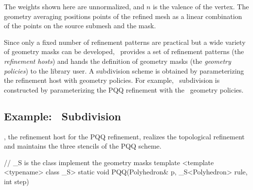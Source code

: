 
The weights shown here are unnormalized, and $n$ is the valence 
of the vertex. 
The geometry averaging positions points of the refined mesh 
as a linear combination of the points on the source submesh and 
the mask.

Since only a fixed number of refinement patterns are 
practical but a wide variety of geometry masks can be developed,
\ provides a set of refinement patterns (the \emph{refinement hosts})
and hands the definition of geometry masks
(the \emph{geometry policies}) to the library user.
A subdivision scheme is obtained by parameterizing the 
refinement host with geometry policies. 
For example, \CC\ subdivision is constructed by 
parameterizing the PQQ refinement with the \CC\ geometry 
policies.



\subsection{Example: \CC\ Subdivision}
, the refinement 
host for the PQQ refinement, realizes the topological 
refinement and maintains the three stencils of the 
PQQ scheme.

\begin{ccExampleCode}
  // _S is the class implement the geometry masks
  template <template <typename> class _S>
  static void PQQ(Polyhedron& p, _S<Polyhedron> rule, int step)
\end{ccExampleCode}

